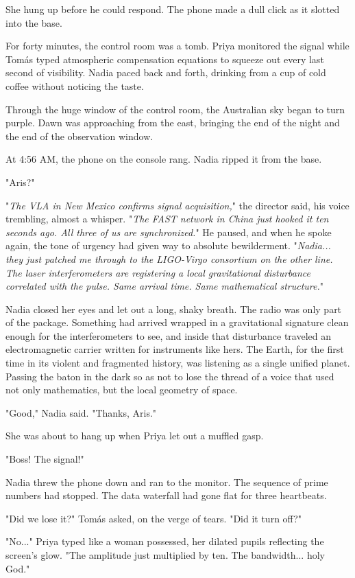 \documentclass[11pt,a5paper,twoside]{book}
\begin{document}
She hung up before he could respond. The phone made a dull click as it slotted into the base.

For forty minutes, the control room was a tomb. Priya monitored the signal while Tomás typed atmospheric compensation equations to squeeze out every last second of visibility. Nadia paced back and forth, drinking from a cup of cold coffee without noticing the taste.

Through the huge window of the control room, the Australian sky began to turn purple. Dawn was approaching from the east, bringing the end of the night and the end of the observation window.

At 4:56 AM, the phone on the console rang. Nadia ripped it from the base.

"Aris?"

"\textit{The VLA in New Mexico confirms signal acquisition,}" the director said, his voice trembling, almost a whisper. "\textit{The FAST network in China just hooked it ten seconds ago. All three of us are synchronized.}" He paused, and when he spoke again, the tone of urgency had given way to absolute bewilderment. "\textit{Nadia... they just patched me through to the LIGO-Virgo consortium on the other line. The laser interferometers are registering a local gravitational disturbance correlated with the pulse. Same arrival time. Same mathematical structure.}"

Nadia closed her eyes and let out a long, shaky breath. The radio was only part of the package. Something had arrived wrapped in a gravitational signature clean enough for the interferometers to see, and inside that disturbance traveled an electromagnetic carrier written for instruments like hers. The Earth, for the first time in its violent and fragmented history, was listening as a single unified planet. Passing the baton in the dark so as not to lose the thread of a voice that used not only mathematics, but the local geometry of space.

"Good," Nadia said. "Thanks, Aris."

She was about to hang up when Priya let out a muffled gasp.

"Boss! The signal!"

Nadia threw the phone down and ran to the monitor. The sequence of prime numbers had stopped. The data waterfall had gone flat for three heartbeats.

"Did we lose it?" Tomás asked, on the verge of tears. "Did it turn off?"

"No..." Priya typed like a woman possessed, her dilated pupils reflecting the screen's glow. "The amplitude just multiplied by ten. The bandwidth... holy God."
\end{document}
